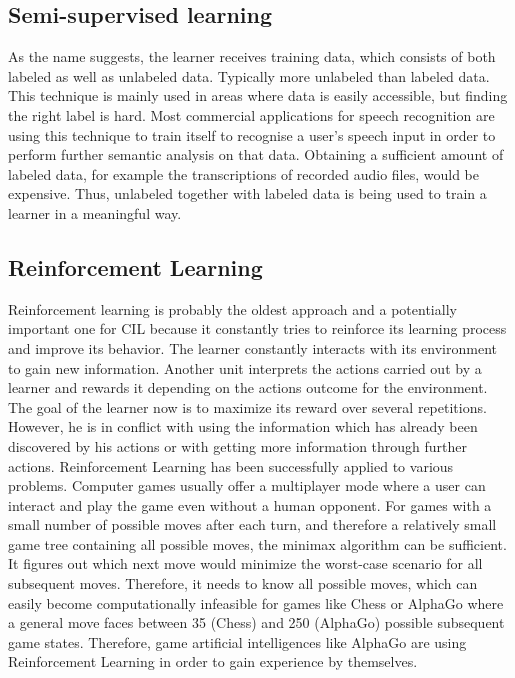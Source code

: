\documentclass[conference]{IEEEtran}
\begin{document}
\subsection{Semi-supervised learning}
As the name suggests, the learner receives training data, which consists of both 
labeled as well as unlabeled data. Typically more unlabeled than labeled data.
This technique is mainly used in areas where data is easily accessible, 
but finding the right label is hard.
Most commercial applications for speech recognition are using this technique to train itself to 
recognise a user's speech input in order to perform further semantic analysis on
that data. Obtaining a sufficient amount of labeled data, for example the transcriptions of 
recorded audio files, would be expensive. Thus, unlabeled together with labeled data is being used 
to train a learner in a meaningful way.

\subsection{Reinforcement Learning}\label{reinforcement}
Reinforcement learning is probably the oldest approach and a potentially important one for CIL because 
it constantly tries to reinforce its learning process and improve its behavior. 
The learner constantly interacts with its environment to gain new information. Another unit interprets the 
actions carried out by a learner and rewards it depending on the actions outcome for the environment. The goal of 
the learner now is to maximize its reward over several repetitions. 
However, he is in conflict with using the information which has already been discovered by his actions 
or with getting more information through further actions. Reinforcement Learning has been successfully 
applied to various problems. 
Computer games usually offer a multiplayer mode where a user can interact and 
play the game even without a human opponent. For games with a small number of 
possible moves after each turn, and therefore a relatively small game tree containing 
all possible moves, the minimax algorithm\cite{Prog2:bachmaier} can be sufficient. 
It figures out which next move would minimize the worst-case scenario for all subsequent 
moves. Therefore, it needs to know all possible moves, which can easily become computationally 
infeasible for games like Chess or AlphaGo where a general move faces between 35 (Chess) and 
250 (AlphaGo) possible subsequent game states. 
Therefore, game artificial intelligences like AlphaGo are using Reinforcement Learning in order to gain 
experience by themselves\cite{Alpha:silver}.
\end{document}
